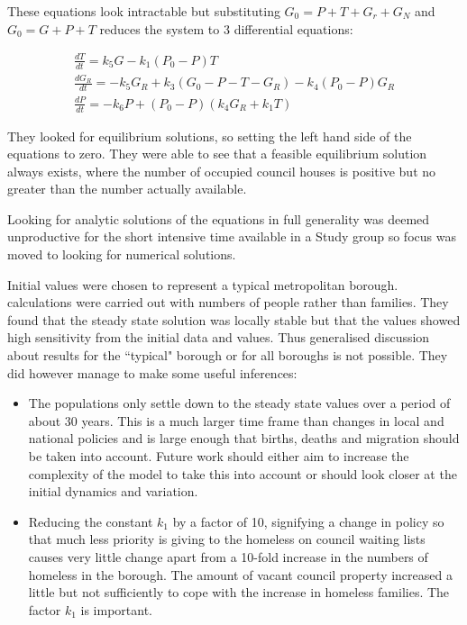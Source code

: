 \documentclass[11pt]{article} %
\begin{document}
These equations look intractable but substituting $ G_0=P+T+G_r+G_N $ and $ G_0=G+P+T$ reduces the system to 3 differential equations:

\begin{eqnarray}
\frac{dT}{dt}=k_5 G -k_1(P_0 -P)T\\
\frac{dG_R}{dt}=-k_5 G_R+k_3(G_0-P-T-G_R)-k_4(P_0-P)G_R\\
\frac{dP}{dt}=-k_6P+(P_0-P)(k_4G_R+k_1T)
\end{eqnarray}
	
	They looked for equilibrium solutions, so setting the left hand side of the equations to zero. They were able to see that a feasible equilibrium solution always exists, where the number of occupied council houses is positive but no greater than the number actually available. 
	
	Looking for analytic solutions of the equations in full generality was deemed unproductive for the short intensive time available in a Study group so focus was moved to looking for numerical solutions. 
	
	Initial values were chosen to represent a typical metropolitan borough. calculations were carried out with numbers of people rather than families. They found that the steady state solution was locally stable but that the values showed high sensitivity from the initial data and values. Thus generalised discussion about results for the ``typical" borough or for all boroughs is not possible. They did however manage to make some useful inferences: 
	

	\begin{itemize}
		\item The populations only settle down to the steady state values over a period of about 30 years. This is a much larger time frame than changes in local and national policies and is large enough that births, deaths and migration should be taken into account. Future work should either aim to increase the complexity of the model to take this into account or should look closer at the initial dynamics and variation. 
		\item Reducing the constant $ k_1 $ by a factor of 10, signifying a change in policy so that much less priority is giving to the homeless on council waiting lists causes very little change apart from a 10-fold increase in the numbers of homeless in the borough. The amount of vacant council property increased a little but not sufficiently to cope with the increase in homeless families. The factor $ k_1 $ is important. 
	\end{itemize}
	
\end{document}
